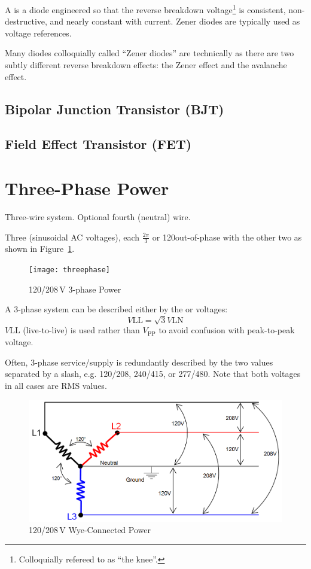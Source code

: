 \documentclass[11pt]{article}
\newlength\onewide
\begin{document}
A  is a diode engineered so that the reverse
breakdown voltage\footnote{Colloquially refereed to as ``the knee''.}
is consistent, non-destructive, and nearly constant with
current. Zener diodes are typically used as voltage references.

Many diodes colloquially called ``Zener diodes'' are technically
 as there are two subtly different reverse
breakdown effects: the Zener effect and the avalanche effect.


\subsection{Bipolar Junction Transistor (BJT)}



\subsection{Field Effect Transistor (FET)}


\section{Three-Phase Power}

Three-wire system. Optional fourth (neutral) wire.

Three  (sinusoidal AC voltages), each $\frac{2\pi}{3}$ or
120\deg out-of-phase with the other two as shown in
Figure~\ref{fig:threephase}.

\begin{figure}[ht]
  \centering
  \texttt{[image: threephase]}
  \caption{120/208\,\unit{V} 3-phase Power}
  \label{fig:threephase}
\end{figure}

A 3-phase system can be described either by the
 or  voltages:
\[
V\mathrm{LL} = \sqrt{3}V\mathrm{LN}
\]
$V\mathrm{LL}$ (live-to-live) is used rather than $V_\mathrm{PP}$ to
avoid confusion with peak-to-peak voltage.
 
Often, 3-phase service/supply is redundantly described by the two
values separated by a slash, e.g. 120/208, 240/415, or 277/480. Note
that both voltages in all cases are RMS values.

\begin{figure}[ht]
  \centering
  \includegraphics[width=\onewide]{wyevoltages}
  \caption{120/208\,\unit{V} Wye-Connected Power}
  \label{fig:wyevoltages}
\end{figure}
\end{document}
